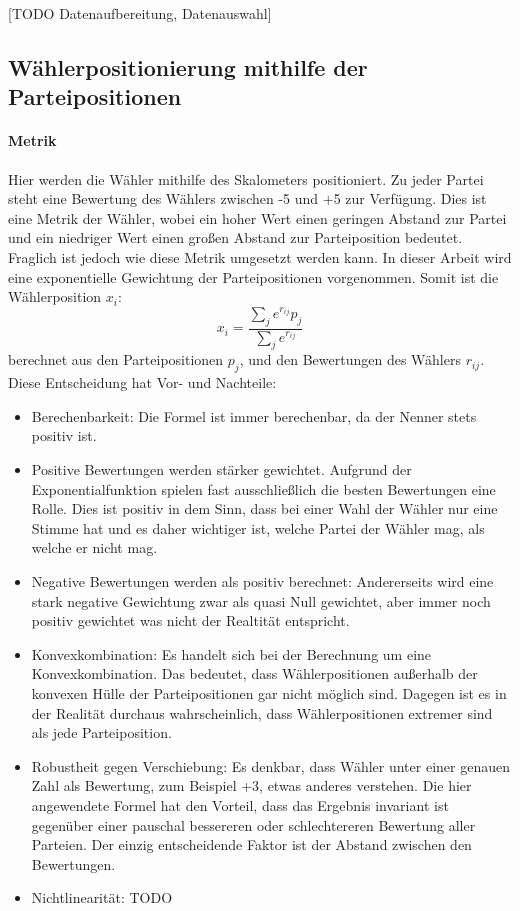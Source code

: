 [TODO Datenaufbereitung, Datenauswahl]

\subsection{Wählerpositionierung mithilfe der Parteipositionen}
\paragraph{Metrik}
Hier werden die Wähler mithilfe des Skalometers positioniert. Zu jeder Partei steht eine Bewertung des Wählers zwischen -5 und +5 zur Verfügung. Dies ist eine Metrik der Wähler, wobei ein hoher Wert einen geringen Abstand zur Partei und ein niedriger Wert einen großen Abstand zur Parteiposition bedeutet.
Fraglich ist jedoch wie diese Metrik umgesetzt werden kann. In dieser Arbeit wird eine exponentielle Gewichtung der Parteipositionen vorgenommen. Somit ist die Wählerposition $x_i$:
\begin{equation}
	x_i = \frac{\sum_j e^{r_{ij}} p_j}{\sum_j e^{r_{ij}}}
\end{equation}
berechnet aus den Parteipositionen $p_j$, und den Bewertungen des Wählers $r_{ij}$.
Diese Entscheidung hat Vor- und Nachteile:
\begin{itemize}
	\item Berechenbarkeit: Die Formel ist immer berechenbar, da der Nenner stets positiv ist.
	\item Positive Bewertungen werden stärker gewichtet. Aufgrund der Exponentialfunktion spielen fast ausschließlich die besten Bewertungen eine Rolle. Dies ist positiv in dem Sinn, dass bei einer Wahl der Wähler nur eine Stimme hat und es daher wichtiger ist, welche Partei der Wähler mag, als welche er nicht mag.
	\item Negative Bewertungen werden als positiv berechnet: Andererseits wird eine stark negative Gewichtung zwar als quasi Null gewichtet, aber immer noch positiv gewichtet was nicht der Realtität entspricht.
	\item Konvexkombination: Es handelt sich bei der Berechnung um eine Konvexkombination. Das bedeutet, dass Wählerpositionen außerhalb der konvexen Hülle der Parteipositionen gar nicht möglich sind. Dagegen ist es in der Realität durchaus wahrscheinlich, dass Wählerpositionen extremer sind als jede Parteiposition.
	\item Robustheit gegen Verschiebung: Es denkbar, dass Wähler unter einer genauen Zahl als Bewertung, zum Beispiel +3, etwas anderes verstehen. Die hier angewendete Formel hat den Vorteil, dass das Ergebnis invariant ist gegenüber einer pauschal bessereren oder schlechtereren Bewertung aller Parteien. Der einzig entscheidende Faktor ist der Abstand zwischen den Bewertungen.
	\item Nichtlinearität: TODO
\end{itemize}


